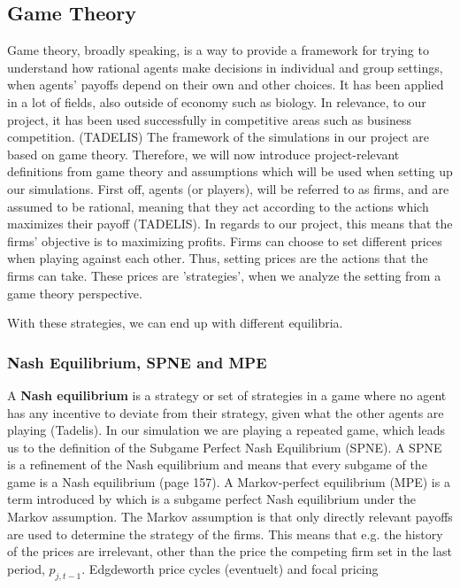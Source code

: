 \documentclass{article}
\begin{document}
\subsection {Game Theory}
\label{GameTheory}
Game theory, broadly speaking, is a way to provide a framework for trying to understand how rational agents make decisions in individual and group settings, when agents' payoffs depend on their own and other choices. It has been applied in a lot of fields, also outside of economy such as biology. In relevance, to our project, it has been used successfully in competitive areas such as business competition. (TADELIS)
\newline
The framework of the simulations in our project are based on game theory. Therefore, we will now introduce project-relevant definitions from game theory and assumptions which will be used when setting up our simulations.
\newline
First off, agents (or players), will be referred to as firms, and are assumed to be rational, meaning that they act according to the actions which maximizes their payoff (TADELIS). In regards to our project, this means that the firms' objective is to maximizing profits.
\newline
Firms can choose to set different prices when playing against each other. Thus, setting prices are the actions that the firms can take.
These prices are 'strategies', when we analyze the setting from a game theory perspective. 

With these strategies, we can end up with different equilibria.
\subsubsection{Nash Equilibrium, SPNE and MPE}
A \textbf{Nash equilibrium} is a strategy or set of strategies in a game where no agent  has any incentive to deviate from their strategy, given what the other agents are playing (Tadelis).
\newline
In our simulation we are playing a repeated game, which leads us to the definition of the Subgame Perfect Nash Equilibrium (SPNE). A SPNE is a refinement of the Nash equilibrium and means that every subgame of the game is a Nash equilibrium \cite{tadelis} (page 157). 
\newline
A Markov-perfect equilibrium (MPE) is a term introduced by \cite{MaskinTirole} which is a subgame perfect Nash equilibrium under the Markov assumption. The Markov assumption is that only directly relevant payoffs are used to determine the strategy of the firms. This means that e.g. the history of the prices are irrelevant, other than the price the competing firm set in the last period, $p_{j,t-1}$. 
\newline
Edgdeworth price cycles (eventuelt) and focal pricing
\end{document}
